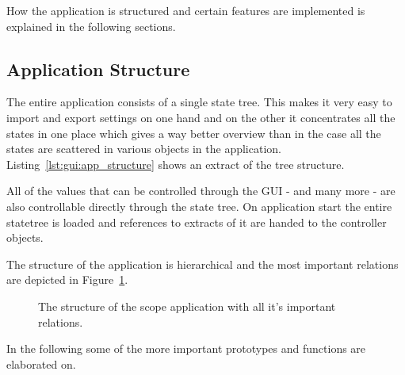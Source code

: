 How the application is structured and certain features are implemented is explained in the following sections.

%
%

\subsection{Application Structure}
\label{subsec:gui:application_structure}

The entire application consists of a single state tree. This makes it very easy to import and export settings on one hand and on the other it concentrates all the states in one place which gives a way better overview than in the case all the states are scattered in various objects in the application.
Listing~\ref{lst:gui:app_structure} shows an extract of the tree structure.


All of the values that can be controlled through the GUI - and many more - are also controllable directly through the state tree.
On application start the entire statetree is loaded and references to extracts of it are handed to the controller objects.

The structure of the application is hierarchical and the most important relations are depicted in Figure~\ref{fig:gui:structure}.

\begin{figure}
    \centering
    
    \caption[The scope structure]{%
        The structure of the scope application with all it's important relations.%
    }
    \label{fig:gui:structure}
\end{figure}

In the following some of the more important prototypes and functions are elaborated on.

